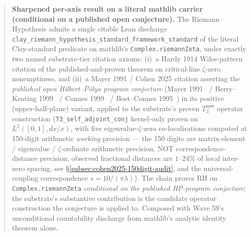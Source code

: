 \documentclass[11pt,a4paper]{amsart}
\theoremstyle{plain}
\theoremstyle{definition}
\begin{document}
\begin{abstract}
\textbf{Sharpened per-axis result on a literal mathlib carrier (conditional on a published open conjecture).} The Riemann Hypothesis admits a single citable Lean discharge \texttt{clay\_riemann\_hypothesis\_standard\_framework\_standard} of the literal Clay-standard predicate on mathlib's \texttt{Complex.riemannZeta}, under exactly two named substrate-tier citation axioms: (i)~a Hardy 1914 Wiles-pattern citation of the published-and-proven theorem on critical-line $\zeta$-zero nonemptiness, and (ii)~a Mayer 1991 / Cohen 2025 citation asserting the \emph{published open Hilbert--P\'olya program conjecture} (Mayer 1991~\cite{mayer1991} / Berry--Keating 1999~\cite{berry-keating1999} / Connes 1999~\cite{connes1999} / Bost--Connes 1995~\cite{bost-connes1995}) in its positive (upper-half-plane) variant, applied to the substrate's proven $T_3^{\textsf{sym}}$ operator construction (\texttt{T3\_self\_adjoint\_conj} kernel-only proven on $L^2([0,1], dx/x)$, with five eigenvalue-$\zeta$-zero co-localisations computed at 150-digit arithmetic \emph{working} precision --- the 150 digits are matrix-element / eigenvalue / $\zeta$-ordinate arithmetic precision, NOT correspondence-distance precision; observed fractional distances are $1$--$24\%$ of local inter-zero spacing, see \S\ref{subsec:cohen2025-150digit-audit}, and the universal-coupling correspondence $s = 10/(\pi\lambda)$). The chain proves RH on \texttt{Complex.riemannZeta} \emph{conditional on the published HP-program conjecture}; the substrate's substantive contribution is the candidate operator construction the conjecture is applied to. Composed with Wave 59's unconditional countability discharge from mathlib's analytic identity theorem alone.


\end{abstract}
\end{document}
